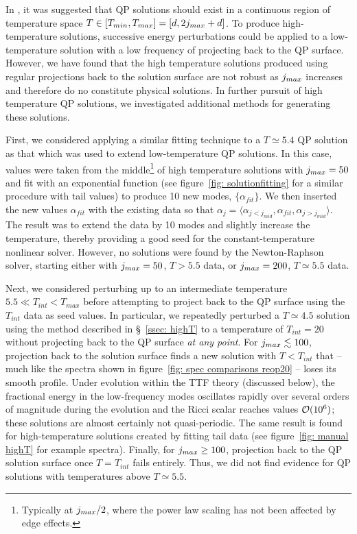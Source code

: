\documentclass[../PhD.tex]{subfiles}
\begin{document}
In \cite{1507.08261}, it was suggested that QP solutions should exist in a continuous region of temperature space ${T \in [T_{min}, T_{max}] = [d, 2j_{max} + d]}$. To produce high-temperature solutions, successive energy perturbations could be applied to a low-temperature solution with a low frequency of projecting back to the QP surface. However, we have found that the high temperature solutions produced using regular projections back to the solution surface are not robust as $j_{max}$ increases and therefore do no constitute physical solutions. In further pursuit of high temperature QP solutions, we investigated additional methods for generating these solutions.

First, we considered applying a similar fitting technique to a $T \simeq 5.4$ QP solution as that which was used to extend low-temperature QP solutions. In this case, values were taken from the middle\footnote{Typically at $j_{max} / 2$, where the power law scaling has not been affected by edge effects.} of high temperature solutions with $j_{max} = 50$ and fit with an exponential function (see figure~\ref{fig: solutionfitting} for a similar procedure with tail values) to produce 10 new modes, $\{ \alpha_{fit} \}$. We then inserted the new values $\alpha_{fit}$ with the existing data so that $\alpha_j = \langle \alpha_{j< j_{mid}}, \alpha_{fit}, \alpha_{j > j_{mid}} \rangle$. The result was to extend the data by 10 modes and slightly increase the temperature, thereby providing a good seed for the constant-temperature nonlinear solver. However, no solutions were found by the Newton-Raphson solver, starting either with $j_{max} = 50$, $T>5.5$ data, or $j_{max} = 200$, $T \simeq 5.5$ data.

Next, we considered perturbing up to an intermediate temperature $5.5 \ll T_{int} < T_{max}$ before attempting to project back to the QP surface using the $T_{int}$ data as seed values. In particular, we repeatedly perturbed a $T \simeq 4.5$ solution using the method described in \S~\ref{ssec: highT} to a temperature of $T_{int} = 20$ without projecting back to the QP surface \emph{at any point}. For $j_{max} \lesssim 100$, projection back to the solution surface finds a new solution with $T < T_{int}$ that -- much like the spectra shown in figure~\ref{fig: spec comparisons reop20} -- loses its smooth profile. Under evolution within the TTF theory (discussed below), the fractional energy in the low-frequency modes oscillates rapidly over several orders of magnitude during the evolution and the Ricci scalar reaches values $\mathcal O (10^6)$; these solutions are almost certainly not quasi-periodic. The same result is found for high-temperature solutions created by fitting tail data (see figure~\ref{fig: manual highT} for example spectra). Finally, for $j_{max} \geq 100$, projection back to the QP solution surface once $T = T_{int}$ fails entirely. Thus, we did not find evidence for QP solutions with temperatures above $T \simeq 5.5$.
\end{document}
